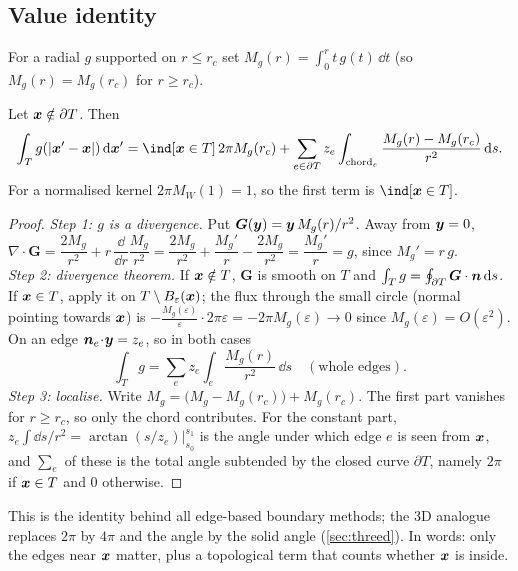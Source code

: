 \subsection{Value identity}
For a radial $g$ supported on $r\le r_c$ set $M_g(r)=\int_0^r t\,g(t)\,\dd t$ (so $M_g(r)=M_g(r_c)$ for $r\ge r_c$).
\begin{theorem}\label{thm:value}
Let $\bm x\notin\partial T$. Then
\begin{equation}\label{eq:value}
 \int_T g(|\xx'-\xx|)\,\dd\xx'=\ind[\xx\in T]\,2\pi M_g(r_c)+\sum_{e\in\partial T}z_e\int_{\chord_e}\frac{M_g(r)-M_g(r_c)}{r^2}\,\dd s.
\end{equation}
For a normalised kernel $2\pi M_W(1)=1$, so the first term is $\ind[\xx\in T]$.
\end{theorem}
\begin{proof}
\emph{Step 1: $g$ is a divergence.} Put $\bm G(\bm y)=\bm y\,M_g(r)/r^2$. Away from $\bm y=0$,
$\nabla\!\cdot\bm G=\dfrac{2M_g}{r^2}+r\,\dfrac{\dd}{\dd r}\dfrac{M_g}{r^2}=\dfrac{2M_g}{r^2}+\dfrac{M_g'}{r}-\dfrac{2M_g}{r^2}=\dfrac{M_g'}r=g$, since $M_g'=r\,g$.\\
\emph{Step 2: divergence theorem.} If $\bm x\notin T$, $\bm G$ is smooth on $T$ and $\int_Tg=\oint_{\partial T}\bm G\cdot\bm n\,\mathrm{d} s$.
If $\bm x\in T$, apply it on $T\setminus B_\varepsilon(\bm x)$; the flux through the small circle (normal pointing towards $\bm x$) is
$-\frac{M_g(\varepsilon)}{\varepsilon}\cdot2\pi\varepsilon=-2\pi M_g(\varepsilon)\to0$ since $M_g(\varepsilon)=O(\varepsilon^2)$.
On an edge $\bm n_e\!\cdot\!\bm y=z_e$, so in both cases
\begin{equation}\label{eq:value-full}
 \int_Tg=\sum_e z_e\int_e\frac{M_g(r)}{r^2}\,\dd s\quad(\text{whole edges}).
\end{equation}
\emph{Step 3: localise.} Write $M_g=\big(M_g-M_g(r_c)\big)+M_g(r_c)$. The first part vanishes for $r\ge r_c$, so only the chord contributes.
For the constant part, $z_e\!\int\!\dd s/r^2=\arctan(s/z_e)\big|_{s_0}^{s_1}$ is the angle under which edge $e$ is seen from $\bm x$, and
$\sum_e$ of these is the total angle subtended by the closed curve $\partial T$, namely $2\pi$ if $\bm x\in T$ and $0$ otherwise.
\end{proof}
This is the identity behind all edge-based boundary methods; the 3D analogue replaces $2\pi$ by $4\pi$ and
the angle by the solid angle (\cref{sec:threed}). In words: only the edges near $\bm x$ matter, plus a topological term that
counts whether $\bm x$ is inside.

